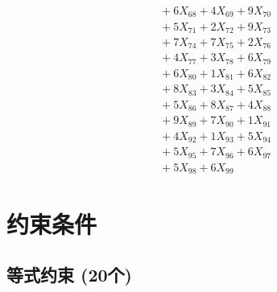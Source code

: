 \documentclass[a4paper,10pt]{article}
\begin{document}
{\begin{align}
&\;  + 6 X_{68} + 4 X_{69} + 9 X_{70} \\[0.3ex]
&\;  + 5 X_{71} + 2 X_{72} + 9 X_{73} \\[0.3ex]
&\;  + 7 X_{74} + 7 X_{75} + 2 X_{76} \\[0.3ex]
&\;  + 4 X_{77} + 3 X_{78} + 6 X_{79} \\[0.5ex]\allowbreak
&\;  + 6 X_{80} + 1 X_{81} + 6 X_{82} \\[0.3ex]
&\;  + 8 X_{83} + 3 X_{84} + 5 X_{85} \\[0.3ex]
&\;  + 5 X_{86} + 8 X_{87} + 4 X_{88} \\[0.3ex]
&\;  + 9 X_{89} + 7 X_{90} + 1 X_{91} \\[0.3ex]
&\;  + 4 X_{92} + 1 X_{93} + 5 X_{94} \\[0.3ex]
&\;  + 5 X_{95} + 7 X_{96} + 6 X_{97} \\[0.3ex]
&\;  + 5 X_{98} + 6 X_{99}\nonumber
\end{align}
}

\section{约束条件}

\subsection{等式约束 (20个)}
\end{document}
